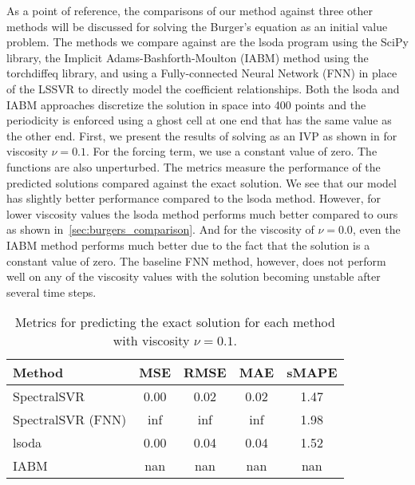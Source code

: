 \documentclass[preprint,12pt,times,authoryear]{elsarticle}
\begin{document}
\noindent As a point of reference, the comparisons of our method against three other methods will be discussed for solving the Burger's equation as an initial value problem. The methods we compare against are the lsoda program using the SciPy library, the Implicit Adams-Bashforth-Moulton (IABM) method using the torchdiffeq library, and using a Fully-connected Neural Network (FNN) in place of the LSSVR to directly model the coefficient relationships. Both the lsoda and IABM approaches discretize the solution in space into 400 points and the periodicity is enforced using a ghost cell at one end that has the same value as the other end. First, we present the results of solving  as an IVP as shown in  for viscosity \(\nu=0.1\). For the forcing term, we use a constant value of zero. The functions are also unperturbed. The metrics measure the performance of the predicted solutions compared against the exact solution. We see that our model has slightly better performance compared to the lsoda method. However, for lower viscosity values the lsoda method performs much better compared to ours as shown in~\ref{sec:burgers_comparison}. And for the viscosity of \(\nu=0.0\), even the IABM method performs much better due to the fact that the solution is a constant value of zero. The baseline FNN method, however, does not perform well on any of the viscosity values with the solution becoming unstable after several time steps.
\begin{table}[htp]
  \caption{Metrics for predicting the exact solution for each method with viscosity \(\nu=0.1\).}\label{table:comparison_exact_metrics_0.1}
  \centering
  \begin{tabular}{lcccc}
    \toprule
    Method            & MSE  & RMSE & MAE  & sMAPE \\
    \midrule

    SpectralSVR       & 0.00 & 0.02 & 0.02 & 1.47  \\
    SpectralSVR (FNN) & inf  & inf  & inf  & 1.98  \\
    lsoda             & 0.00 & 0.04 & 0.04 & 1.52  \\
    IABM              & nan  & nan  & nan  & nan   \\
    \bottomrule
  \end{tabular}
\end{table}
\end{document}

